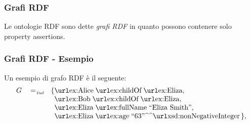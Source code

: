 \documentclass[8pt]{beamer}
\begin{document}
\begin{frame}
 \frametitle{Grafi RDF}
 Le ontologie RDF sono dette \emph{grafi RDF} in quanto possono contenere solo
 property assertions.
 \vspace{\baselineskip}
 

\end{frame}

\newcommand{\triple}[3]{\mathurl{#1}\;\mathurl{#2}\;#3}
\newcommand{\tripleO}[3]{\mathurl{#1}\;\mathurl{#2}\;\mathurl{#3}}

\begin{frame}
 \frametitle{Grafi RDF - Esempio}
 Un esempio di grafo RDF \`e il seguente:
 \[
 \begin{array}{rcl}
  G & \defAs & \{ \tripleO{ex:Alice}{ex:childOf}{ex:Eliza},\\
  &&\phantom{\{} \tripleO{ex:Bob}{ex:childOf}{ex:Eliza},\\
  &&\phantom{\{} \triple{ex:Eliza}{ex:fullName}{\stringLiteral{Eliza Smith}},\\
  &&\phantom{\{} \triple{ex:Eliza}{ex:age}{\literal{63}{xsd:nonNegativeInteger}} \,\},\\
 \end{array}
\]
\end{frame}
\end{document}

